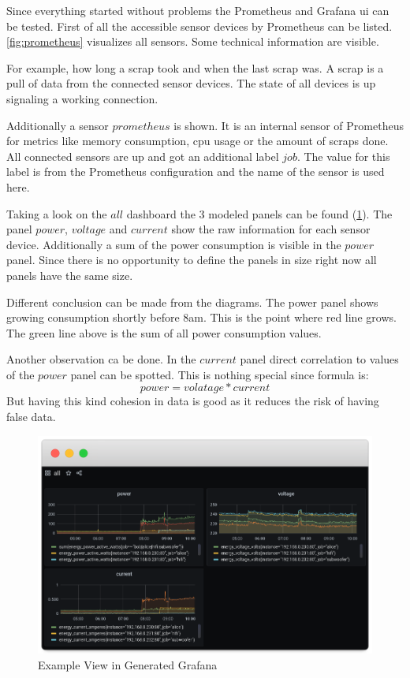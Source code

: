 Since everything started without problems the Prometheus and Grafana \gls{ui} can be tested. First of all the accessible sensor devices by Prometheus can be listed. \cref{fig:prometheus} visualizes all sensors. Some technical information are visible. 

For example, how long a scrap took and when the last scrap was. A scrap is a pull of data from the connected sensor devices. The state of all devices is up signaling a working connection. 

Additionally a sensor $prometheus$ is shown. It is an internal sensor of Prometheus for metrics like memory consumption, \gls{cpu} usage or the amount of scraps done. All connected sensors are up and got an additional label $job$. The value for this label is from the Prometheus configuration and the name of the sensor is used here.


Taking a look on the $all$ dashboard the 3 modeled panels can be found (\cref{fig:grafana}). The panel $power$, $voltage$ and $current$ show the raw information for each sensor device. Additionally a sum of the power consumption is visible in the $power$ panel. Since there is no opportunity to define the panels in size right now all panels have the same size. 

Different conclusion can be made from the diagrams. The power panel shows growing consumption shortly before 8am. This is the point where red line grows. The green line above is the sum of all power consumption values. 

Another observation ca be done. In the $current$ panel direct correlation to values of the $power$ panel can be spotted. This is nothing special since formula is:
\begin{equation*}
power = volatage * current
\end{equation*}
But having this kind cohesion in data is good as it reduces the risk of having false data. 


\begin{figure}[!ht]
	\includegraphics[width=\linewidth]{assets/images/dashboard_all}
	\caption{Example View in Generated Grafana}
	\label{fig:grafana}
\end{figure}